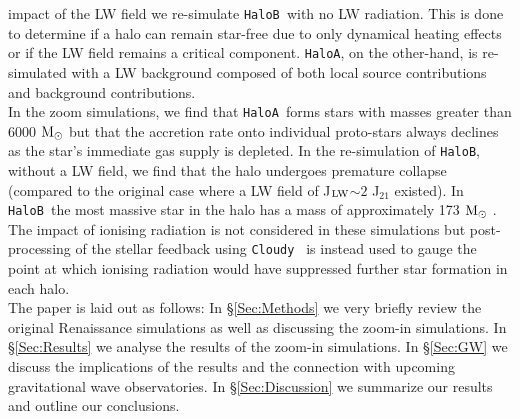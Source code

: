 \documentclass[graphics, twocolumn, usenatbib]{mn2e}
\newcommand{\cloudy}{\texttt{Cloudy~}}
\newcommand{\msolar} {$\rm{M_{\odot}}~$}
\newcommand{\JLW} {J$_{\rm LW}$}
\newcommand{\ha} {\texttt{HaloA~}}
\newcommand{\hb} {\texttt{HaloB~}}
\newcommand{\hac} {\texttt{HaloA}}
\newcommand{\hbc} {\texttt{HaloB}}
\begin{document}
  impact of the LW field we re-simulate \hb with no LW radiation. This is done to determine if a
  halo can remain star-free due to only dynamical heating effects or if the LW field 
  remains a critical component. \hac, on the other-hand, is re-simulated with a LW background
  composed of both local source contributions and background contributions. \\
  \indent In the zoom simulations, we find that \ha forms stars with masses greater than 6000 \msolar but that the accretion
  rate onto individual proto-stars always declines as the star's immediate gas supply is depleted. In the
  re-simulation of \hbc, without a LW field, we find that the halo undergoes premature collapse
  (compared to the original case where a LW field of \JLW $\sim 2$ J$_{21}$ existed). In \hb the
  most massive star in the halo has a mass of approximately 173 \msolar. The impact of ionising
  radiation is not considered in these simulations but post-processing of the stellar feedback
  using \cloudy \citep{Ferland_2017} is instead used to gauge the point at which ionising radiation
  would have suppressed further star formation in each halo. \\
  \indent The paper is laid out as follows: In \S \ref{Sec:Methods} we very briefly review the original Renaissance
  simulations as well as discussing the zoom-in simulations. In \S \ref{Sec:Results} we analyse the results of the
  zoom-in simulations. In \S \ref{Sec:GW} we discuss the implications of the results and the connection with
  upcoming gravitational wave observatories. In \S \ref{Sec:Discussion} we summarize our results and outline
  our conclusions.
  
\end{document}
